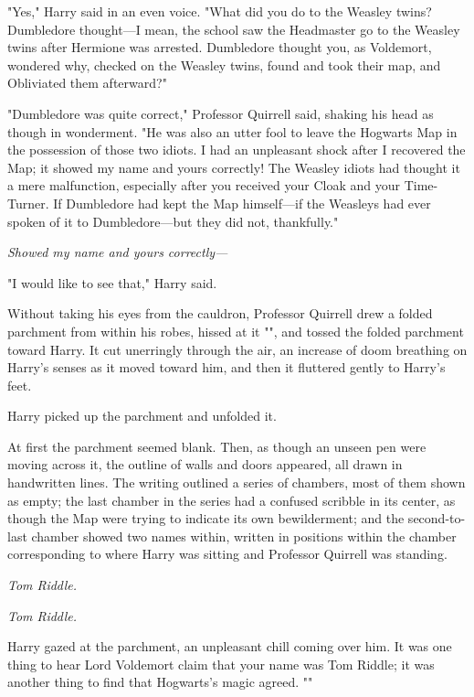 "Yes," Harry said in an even voice. "What did you do to the Weasley twins? 
Dumbledore thought---I mean, the school saw the Headmaster go to the Weasley 
twins after Hermione was arrested. Dumbledore thought you, as Voldemort, 
wondered why, checked on the Weasley twins, found and took their map, and 
Obliviated them afterward?"

"Dumbledore was quite correct," Professor Quirrell said, shaking his head as 
though in wonderment. "He was also an utter fool to leave the Hogwarts Map in 
the possession of those two idiots. I had an unpleasant shock after I recovered 
the Map; it showed my name and yours correctly! The Weasley idiots had thought 
it a mere malfunction, especially after you received your Cloak and your 
Time-Turner. If Dumbledore had kept the Map himself---if the Weasleys had ever 
spoken of it to Dumbledore---but they did not, thankfully."

\emph{Showed my name and yours correctly---}

"I would like to see that," Harry said.

Without taking his eyes from the cauldron, Professor Quirrell drew a folded 
parchment from within his robes, hissed at it "", and tossed the folded parchment toward Harry. It cut 
unerringly through the air, an increase of doom breathing on Harry's senses as 
it moved toward him, and then it fluttered gently to Harry's feet.

Harry picked up the parchment and unfolded it.

At first the parchment seemed blank. Then, as though an unseen pen were moving 
across it, the outline of walls and doors appeared, all drawn in handwritten 
lines. The writing outlined a series of chambers, most of them shown as empty; 
the last chamber in the series had a confused scribble in its center, as though 
the Map were trying to indicate its own bewilderment; and the second-to-last 
chamber showed two names within, written in positions within the chamber 
corresponding to where Harry was sitting and Professor Quirrell was standing.

\emph{Tom Riddle.}

\emph{Tom Riddle.}

Harry gazed at the parchment, an unpleasant chill coming over him. It was one 
thing to hear Lord Voldemort claim that your name was Tom Riddle; it was 
another thing to find that Hogwarts's magic agreed. ""

